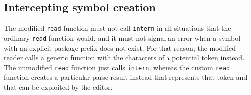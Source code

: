 \subsection{Intercepting symbol creation}

The modified \texttt{read} function must not call \texttt{intern} in
all situations that the ordinary \texttt{read} function would, and it
must not signal an error when a symbol with an explicit package prefix
does not exist.  For that reason, the modified reader calls a generic
function with the characters of a potential token instead.  The
unmodified \texttt{read} function just calls \texttt{intern}, whereas
the custom \texttt{read} function creates a particular parse result
instead that represents that token and that can be exploited by the
editor.
